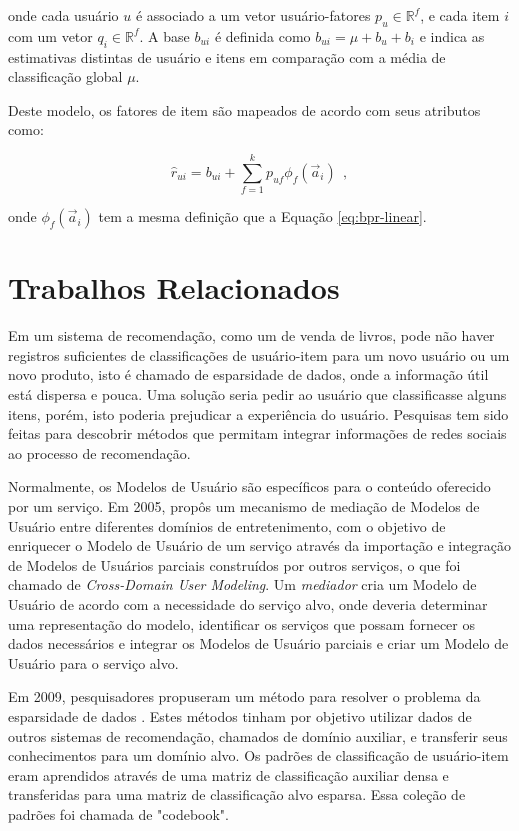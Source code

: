 \noindent onde cada usuário $u$ é associado a um vetor usuário-fatores $p_u \in \mathbb{R}^f$, e cada item $i$ com um vetor $q_i \in \mathbb{R}^f$. A base $b_{ui}$ é definida como $b_{ui} = \mu + b_u + b_i$ e indica as estimativas distintas de usuário e itens em comparação com a média de classificação global $\mu$.

Deste modelo, os fatores de item são mapeados de acordo com seus atributos como:

\begin{equation}
\hat{r}_{ui} = b_{ui} + \displaystyle\sum_{f=1}^{k}p_{uf} \phi_f(\vec{a}_i)~~,
\end{equation}

\noindent onde $\phi_f(\vec{a}_i)$ tem a mesma definição que a Equação \ref{eq:bpr-linear}. 



\section{Trabalhos Relacionados}

Em um sistema de recomendação, como um de venda de livros, pode não haver registros suficientes de classificações de usuário-item para um novo usuário ou um novo produto, isto é chamado de esparsidade de dados, onde a informação útil está dispersa e pouca. Uma solução seria pedir ao usuário que classificasse alguns itens, porém, isto poderia prejudicar a experiência do usuário. Pesquisas tem sido feitas para descobrir métodos que permitam integrar informações de redes sociais ao processo de recomendação.

Normalmente, os Modelos de Usuário são específicos para o conteúdo oferecido por um serviço. Em 2005, \cite{Berkovsky:2005:EPM:2153634.2153658} propôs um mecanismo de mediação de Modelos de Usuário entre diferentes domínios de entretenimento, com o objetivo de enriquecer o Modelo de Usuário de um serviço através da importação e integração de Modelos de Usuários parciais construídos por outros serviços, o que foi chamado de \textit{Cross-Domain User Modeling}. Um \textit{mediador} cria um Modelo de Usuário de acordo com a necessidade do serviço alvo, onde deveria determinar uma representação do modelo, identificar os serviços que possam fornecer os dados necessários e integrar os Modelos de Usuário parciais e criar um Modelo de Usuário para o serviço alvo.

Em 2009, pesquisadores propuseram um método para resolver o problema da esparsidade de dados \citep{Li:2009:MBC:1661445.1661773}. Estes métodos tinham por objetivo utilizar dados de outros sistemas de recomendação, chamados de domínio auxiliar, e transferir seus conhecimentos para um domínio alvo. Os padrões de classificação de usuário-item eram aprendidos através de uma matriz de classificação auxiliar densa e transferidas para uma matriz de classificação alvo esparsa. Essa coleção de padrões foi chamada de "codebook".

